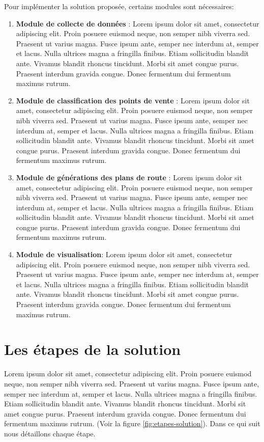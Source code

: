 Pour implémenter la solution proposée, certains modules sont nécessaires:
\begin{enumerate}
  \item \textbf{Module de collecte de données} : Lorem ipsum dolor sit amet, consectetur adipiscing elit. Proin posuere euismod neque, non semper nibh viverra sed. Praesent ut varius magna. Fusce ipsum ante, semper nec interdum at, semper et lacus. Nulla ultrices magna a fringilla finibus. Etiam sollicitudin blandit ante. Vivamus blandit rhoncus tincidunt. Morbi sit amet congue purus. Praesent interdum gravida congue. Donec fermentum dui fermentum maximus rutrum.
  \item \textbf{Module de classification des points de vente} : Lorem ipsum dolor sit amet, consectetur adipiscing elit. Proin posuere euismod neque, non semper nibh viverra sed. Praesent ut varius magna. Fusce ipsum ante, semper nec interdum at, semper et lacus. Nulla ultrices magna a fringilla finibus. Etiam sollicitudin blandit ante. Vivamus blandit rhoncus tincidunt. Morbi sit amet congue purus. Praesent interdum gravida congue. Donec fermentum dui fermentum maximus rutrum.
  \item \textbf{Module de générations des plans de route} : Lorem ipsum dolor sit amet, consectetur adipiscing elit. Proin posuere euismod neque, non semper nibh viverra sed. Praesent ut varius magna. Fusce ipsum ante, semper nec interdum at, semper et lacus. Nulla ultrices magna a fringilla finibus. Etiam sollicitudin blandit ante. Vivamus blandit rhoncus tincidunt. Morbi sit amet congue purus. Praesent interdum gravida congue. Donec fermentum dui fermentum maximus rutrum.
  \item \textbf{Module de visualisation}: Lorem ipsum dolor sit amet, consectetur adipiscing elit. Proin posuere euismod neque, non semper nibh viverra sed. Praesent ut varius magna. Fusce ipsum ante, semper nec interdum at, semper et lacus. Nulla ultrices magna a fringilla finibus. Etiam sollicitudin blandit ante. Vivamus blandit rhoncus tincidunt. Morbi sit amet congue purus. Praesent interdum gravida congue. Donec fermentum dui fermentum maximus rutrum.
\end{enumerate}

\section{Les étapes de la solution}
Lorem ipsum dolor sit amet, consectetur adipiscing elit. Proin posuere euismod neque, non semper nibh viverra sed. Praesent ut varius magna. Fusce ipsum ante, semper nec interdum at, semper et lacus. Nulla ultrices magna a fringilla finibus. Etiam sollicitudin blandit ante. Vivamus blandit rhoncus tincidunt. Morbi sit amet congue purus. Praesent interdum gravida congue. Donec fermentum dui fermentum maximus rutrum. (Voir la figure \ref{fig:etapes-solution}). Dans ce qui suit nous détaillons chaque étape.

